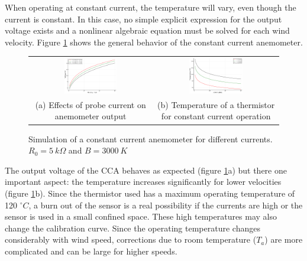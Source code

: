 \documentclass[10pt,fleqn,a4paper,twoside]{article}
\begin{document}
When operating at constant current, the temperature will vary, even though the current is constant. In this case, no simple explicit expression for the output voltage exists and a nonlinear algebraic equation must be solved for each wind velocity. Figure \ref{fig:cca1} shows the general behavior of the constant current anemometer.

\begin{figure}[h!]
\centering
  \begin{tabular}{cc}
    \includegraphics[width=0.45\textwidth]{../../figures/CCA-Eo.pdf} & 
    \includegraphics[width=0.45\textwidth]{../../figures/CCA-T.pdf} \\
    \parbox{0.4\textwidth}{\footnotesize (a) Effects of probe current on anemometer output} & \parbox{0.4\textwidth}{\footnotesize (b) Temperature of a thermistor for constant current operation}\\
  \end{tabular}
  \vspace{0.4cm}

\caption{Simulation of a constant current anemometer for different currents. $R_0 = 5\:k\Omega$ and $B = 3000\:K$}
\label{fig:cca1}
\end{figure}

The output voltage of the CCA behaves as expected (figure \ref{fig:cca1}a) but there one important aspect: the temperature increases significantly for lower velocities (figure \ref{fig:cca1}b). Since the thermistor used has a maximum operating temperature of 120 $^\circ C$, a burn out of the sensor is a real possibility if the currents are high or the sensor is used in a small confined space. These high temperatures may also change the calibration curve. Since the operating temperature changes considerably with wind speed, corrections due to room temperature ($T_a$) are more complicated and can be large for higher speeds.
\end{document}
